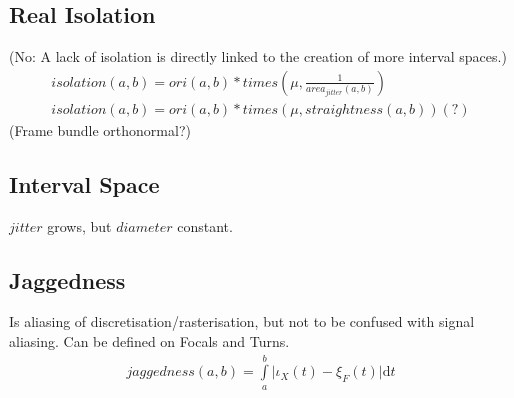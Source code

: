 \documentclass{report}
\begin{document}
\subsection{Real Isolation}
(No: A lack of isolation is directly linked to the creation of more interval spaces.)
\begin{align}
isolation(a,b) = ori(a,b)*times(\mu,\frac{1}{area_{jitter}(a,b)})\\
isolation(a,b) = ori(a,b)*times(\mu,straightness(a,b))(?)
\end{align}
(Frame bundle orthonormal?)
\subsection*{Interval Space}
$jitter$ grows, but $diameter$ constant.

\subsection{Jaggedness}
Is aliasing of discretisation/rasterisation, but not to be confused with signal aliasing. Can be defined on Focals and Turns.
\begin{align}
jaggedness(a,b)=\int \limits _{a}^{b} \lvert \iota_{X}(t)-\xi_{F}(t)\rvert \mathrm{d}t
\end{align}
\end{document}
